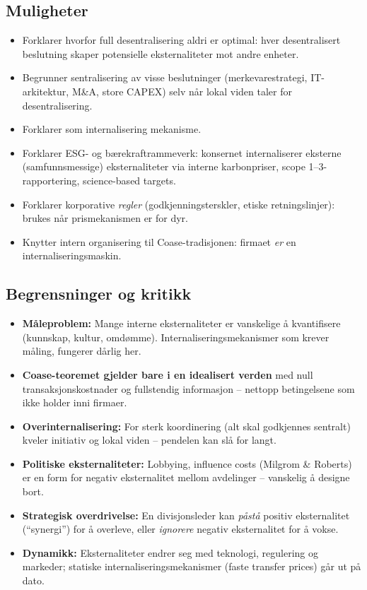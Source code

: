 \subsection*{Muligheter}
\begin{itemize}
\item Forklarer hvorfor full desentralisering aldri er optimal: hver desentralisert beslutning skaper potensielle eksternaliteter mot andre enheter.
\item Begrunner sentralisering av visse beslutninger (merkevarestrategi, IT-arkitektur, M\&A, store CAPEX) selv når lokal viden taler for desentralisering.
\item Forklarer  som internalisering mekanisme.
\item Forklarer ESG- og bærekraftrammeverk: konsernet internaliserer eksterne (samfunnsmessige) eksternaliteter via interne karbonpriser, scope 1--3-rapportering, science-based targets.
\item Forklarer korporative \emph{regler} (godkjenningsterskler, etiske retningslinjer): brukes når prismekanismen er for dyr.
\item Knytter intern organisering til Coase-tradisjonen: firmaet \emph{er} en internaliseringsmaskin.
\end{itemize}

\subsection*{Begrensninger og kritikk}
\begin{itemize}
\item \textbf{Måleproblem:} Mange interne eksternaliteter er vanskelige å kvantifisere (kunnskap, kultur, omdømme). Internaliseringsmekanismer som krever måling, fungerer dårlig her.
\item \textbf{Coase-teoremet gjelder bare i en idealisert verden} med null transaksjonskostnader og fullstendig informasjon -- nettopp betingelsene som ikke holder inni firmaer.
\item \textbf{Over\-internalisering:} For sterk koordinering (alt skal godkjennes sentralt) kveler initiativ og lokal viden -- pendelen kan slå for langt.
\item \textbf{Politiske eksternaliteter:} Lobbying, influence costs (Milgrom \& Roberts) er en form for negativ eksternalitet mellom avdelinger -- vanskelig å designe bort.
\item \textbf{Strategisk overdrivelse:} En divisjonsleder kan \emph{påstå} positiv eksternalitet (``synergi'') for å overleve, eller \emph{ignorere} negativ eksternalitet for å vokse.
\item \textbf{Dynamikk:} Eksternaliteter endrer seg med teknologi, regulering og markeder; statiske internaliseringsmekanismer (faste transfer prices) går ut på dato.
\end{itemize}

